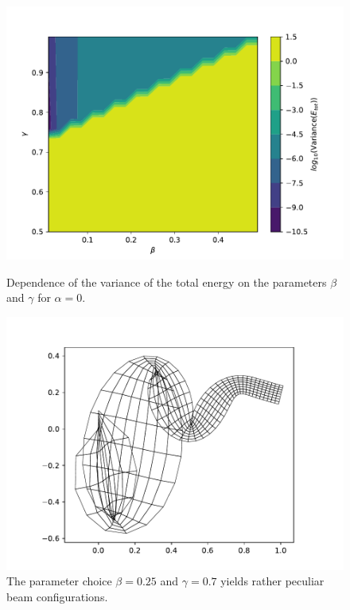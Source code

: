 \documentclass{report}
\begin{document}
\begin{figure}[h]
\centering
\begin{minipage}[t]{0.45\textwidth}
\centering
\includegraphics[width=\textwidth]{../Plots/Project3_main/Figure_910.pdf}
\caption{Dependence of the variance of the total energy on the parameters $\beta$ and $\gamma$ for $\alpha=0$.}
\label{pl:beam_exp_betagamma_alpha0}
\end{minipage}
\hfill
\begin{minipage}[t]{0.45\textwidth}
\centering
\includegraphics[width=\textwidth]{../Plots/Project3_main/Figure_50.pdf}
\caption{The parameter choice $\beta=0.25$ and $\gamma=0.7$ yields rather peculiar beam configurations.}
\label{pl:beam_exp_betagamma_instable1}
\end{minipage}
\end{figure}
\end{document}
